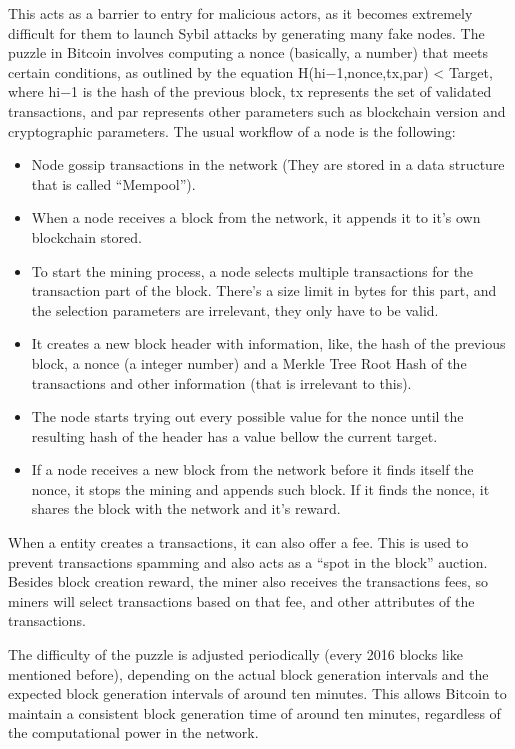 This acts as a barrier to entry for malicious actors, as it becomes extremely difficult for them to launch Sybil attacks by generating many fake nodes.
The puzzle in Bitcoin involves computing a nonce (basically, a number) that meets certain conditions, as outlined by the equation H(hi−1,nonce,tx,par) < Target, where hi−1 is the hash of the previous block, tx represents the set of validated transactions, and par represents other parameters such as blockchain version and cryptographic parameters.
The usual workflow of a node is the following:
\begin{itemize}
    \item Node gossip transactions in the network (They are stored in a data structure that is called ``Mempool'').
    \item When a node receives a block from the network, it appends it to it's own blockchain stored.
    \item To start the mining process, a node selects multiple transactions for the transaction part of the block. There's a size limit in bytes for this part, and the selection parameters are irrelevant, they only have to be valid.
    \item It creates a new block header with information, like, the hash of the previous block, a nonce (a integer number) and a Merkle Tree Root Hash of the transactions and other information (that is irrelevant to this).
    \item The node starts trying out every possible value for the nonce until the resulting hash of the header has a value bellow the current target.
    \item If a node receives a new block from the network before it finds itself the nonce, it stops the mining and appends such block. If it finds the nonce, it shares the block with the network and it's reward.
    
\end{itemize}

When a entity creates a transactions, it can also offer a fee. This is used to prevent transactions spamming and also acts as a ``spot in the block'' auction.
Besides block creation reward, the miner also receives the transactions fees, so miners will select transactions based on that fee, and other attributes of the transactions.

The difficulty of the puzzle is adjusted periodically (every 2016 blocks like mentioned before), depending on the actual block generation intervals and the expected block generation intervals of around ten minutes. This allows Bitcoin to maintain a consistent block generation time of around ten minutes, regardless of the computational power in the network.

